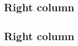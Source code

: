 \documentclass[a4paper, 11pt]{article}
\begin{document}
\begin{poster}
\begin{postercolumns}[3]
    \begin{posterblock}
      \section{Right column}
    \end{posterblock}
    \begin{posterblock}
      \section{Right column}
    \end{posterblock}

  \end{postercolumns}

  \begin{logobar}[logobar]
    \centering
    \hfill
    \hfill
    \hfill
  \end{logobar}

\end{poster}
\end{document}
